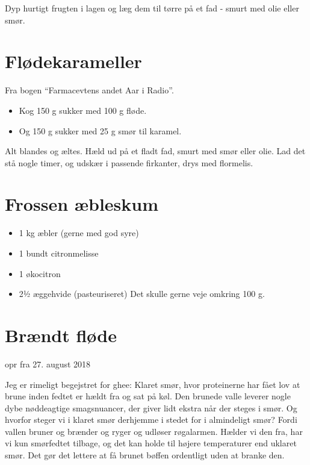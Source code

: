 \documentclass[
  letterpaper,
  DIV=11,
  numbers=noendperiod]{scrreprt}
\providecommand{\tightlist}{%
  \setlength{\itemsep}{0pt}\setlength{\parskip}{0pt}}\usepackage{longtable,booktabs,array}
\begin{document}
Dyp hurtigt frugten i lagen og læg dem til tørre på et fad - smurt med
olie eller smør.

\hypertarget{fluxf8dekarameller}{%
\section{Flødekarameller}\label{fluxf8dekarameller}}

Fra bogen ``Farmacevtens andet Aar i Radio''.

\begin{itemize}
\item
  Kog 150 g sukker med 100 g fløde.
\item
  Og 150 g sukker med 25 g smør til karamel.
\end{itemize}

Alt blandes og æltes. Hæld ud på et fladt fad, smurt med smør eller
olie. Lad det stå nogle timer, og udskær i passende firkanter, drys med
flormelis.

\hypertarget{frossen-uxe6bleskum}{%
\section{Frossen æbleskum}\label{frossen-uxe6bleskum}}

\begin{itemize}
\tightlist
\item
  1 kg æbler (gerne med god syre)
\item
  1 bundt citronmelisse
\item
  1 økocitron
\item
  2½ æggehvide (pasteuriseret) Det skulle gerne veje omkring 100 g.
\end{itemize}

\hypertarget{bruxe6ndt-fluxf8de}{%
\section{Brændt fløde}\label{bruxe6ndt-fluxf8de}}

opr fra 27. august 2018

Jeg er rimeligt begejstret for ghee: Klaret smør, hvor proteinerne har
fået lov at brune inden fedtet er hældt fra og sat på køl. Den brunede
valle leverer nogle dybe nøddeagtige smagsnuancer, der giver lidt ekstra
når der steges i smør. Og hvorfor steger vi i klaret smør derhjemme i
stedet for i almindeligt smør? Fordi vallen bruner og brænder og ryger
og udløser røgalarmen. Hælder vi den fra, har vi kun smørfedtet tilbage,
og det kan holde til højere temperaturer end uklaret smør. Det gør det
lettere at få brunet bøffen ordentligt uden at branke den.
\end{document}
